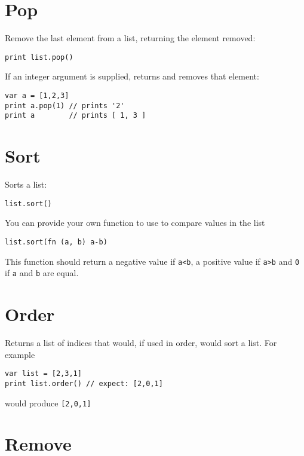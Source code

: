 \hypertarget{pop}{%
\section{Pop}\label{pop}}

Remove the last element from a list, returning the element removed:

\begin{lstlisting}
print list.pop()
\end{lstlisting}

If an integer argument is supplied, returns and removes that element:

\begin{lstlisting}
var a = [1,2,3]
print a.pop(1) // prints '2'
print a        // prints [ 1, 3 ]
\end{lstlisting}

\hypertarget{sort}{%
\section{Sort}\label{sort}}

Sorts a list:

\begin{lstlisting}
list.sort()
\end{lstlisting}

You can provide your own function to use to compare values in the list

\begin{lstlisting}
list.sort(fn (a, b) a-b)
\end{lstlisting}

This function should return a negative value if \texttt{a\textless{}b},
a positive value if \texttt{a\textgreater{}b} and \texttt{0} if
\texttt{a} and \texttt{b} are equal.

\hypertarget{order}{%
\section{Order}\label{order}}

Returns a list of indices that would, if used in order, would sort a
list. For example

\begin{lstlisting}
var list = [2,3,1]
print list.order() // expect: [2,0,1]
\end{lstlisting}

would produce \texttt{{[}2,0,1{]}}

\hypertarget{remove}{%
\section{Remove}\label{remove}}

